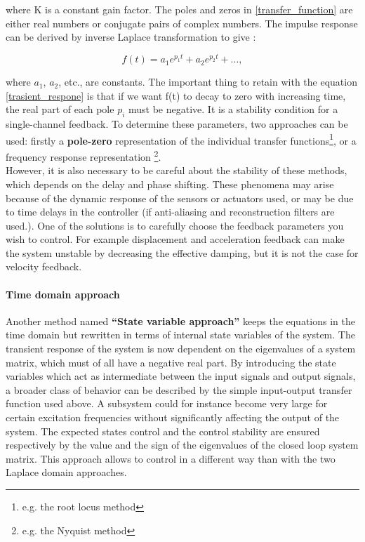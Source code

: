 \documentclass[11pt, twocolumn]{article}
\begin{document}
where K is a constant gain factor. The poles and zeros in \eqref{transfer_function} are either real numbers or
conjugate pairs of complex numbers.
The impulse response can be derived by inverse Laplace transformation  to give : 

\begin{equation}
  f(t) = a_1 e^{p_1 t}  + a_2 e^{p_2 t} + ...,  
  \label{trasient_respone}
\end{equation}


where $a_1$, $a_2$, etc., are constants. The important thing to retain with the equation \eqref{trasient_respone} is that if we want f(t) to decay to zero with increasing time, the real part of each pole $p_i$ must be negative. It is a stability condition for a single-channel feedback. 
To determine these parameters, two approaches can be used: firstly a \textbf{pole-zero} representation of the individual transfer functions\footnote{e.g. the root locus method}, or a frequency response representation \footnote{e.g. the Nyquist method}.\\

However, it is also necessary to be careful about the stability of these methods, which depends on the delay and phase shifting. These phenomena may arise because of the dynamic response of the sensors or actuators used, or
may be due to time delays in the controller (if anti-aliasing and
reconstruction filters are used.).
One of the solutions is to carefully choose the feedback parameters you wish to control. For example displacement and acceleration feedback can make the system unstable by decreasing the effective damping, but it is not the case for velocity feedback.\\

\paragraph{Time domain approach}

Another method named \textbf{“State variable approach”} keeps the equations in the time domain but rewritten in terms of internal state variables of the system. The transient response of the system is now dependent on the eigenvalues of a system matrix, which must of all have a negative real part. By introducing the state variables which act as intermediate between the input signals and output signals, a broader class of behavior can be described by the simple input-output transfer function used above.  A subsystem could for instance become very large for certain excitation frequencies without significantly affecting the output of the system. The expected states control and the control stability are ensured respectively by the value and the sign of the eigenvalues of the closed loop system matrix. This approach allows to control in a different way than with the two Laplace domain approaches. \\
\end{document}
